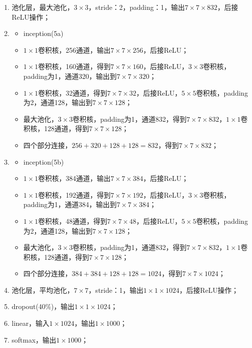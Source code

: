 \begin{enumerate}
	\item 池化层，最大池化，$3\times3$，stride：2，padding：1，输出$7\times7\times832$，后接ReLU操作；
	\item
	      \begin{itemize}
		      \item inception(5a)
		      \item $1\times1$卷积核，256通道，输出$7\times7\times256$，后接ReLU；
		      \item $1\times1$卷积核，160通道，得到$7\times7\times160$，后接ReLU，$3\times3$卷积核，padding为1，通道320，输出到$7\times7\times320$；
		      \item $1\times1$卷积核，32通道，得到$7\times7\times32$，后接ReLU，$5\times5$卷积核，padding为2，通道128，输出到$7\times7\times128$；
		      \item 最大池化，$3\times3$卷积核，padding为1，通道832，得到$7\times7\times832$，$1\times1$卷积核，128通道，得到$7\times7\times128$；
		      \item 四个部分连接，$256+320+128+128=832$，得到$7\times7\times832$；
	      \end{itemize}
	\item
	      \begin{itemize}
		      \item inception(5b)
		      \item $1\times1$卷积核，384通道，输出$7\times7\times384$，后接ReLU；
		      \item $1\times1$卷积核，192通道，得到$7\times7\times192$，后接ReLU，$3\times3$卷积核，padding为1，通道384，输出到$7\times7\times384$；
		      \item $1\times1$卷积核，48通道，得到$7\times7\times48$，后接ReLU，$5\times5$卷积核，padding为2，通道128，输出到$7\times7\times128$；
		      \item 最大池化，$3\times3$卷积核，padding为1，通道832，得到$7\times7\times832$，$1\times1$卷积核，128通道，得到$7\times7\times128$；
		      \item 四个部分连接，$384+384+128+128=1024$，得到$7\times7\times1024$；
	      \end{itemize}
	\item 池化层，平均池化，$7\times7$，stride：1，输出$1\times1\times1024$，后接ReLU操作；
	\item dropout(40\%)，输出$1\times1\times1024$；
	\item linear，输入$1\times1024$，输出$1\times1000$；
	\item softmax，输出$1\times1000$；
\end{enumerate}

